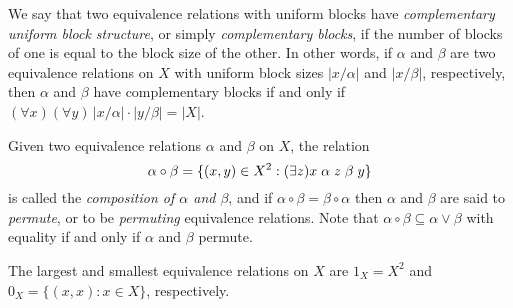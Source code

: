 \documentclass{amsart}
\theoremstyle{plain}
\theoremstyle{definition}
\theoremstyle{definition}
\numberwithin{equation}{section}
\newcommand{\<}{\ensuremath{\langle}}
\renewcommand{\>}{\ensuremath{\rangle}}
\newcommand{\Eq}{\ensuremath{\operatorname{Eq}}}
\newcommand{\rel}{\ensuremath{\mathrel}}
\newcommand{\join}{\ensuremath{\vee}}
\begin{document}
We say that two equivalence relations with uniform
blocks  have 
\emph{complementary uniform block structure}, or simply \emph{complementary
  blocks}, if the number of blocks of one is equal to
the block size of the other. In other words, if $\alpha$ and $\beta$ are two
equivalence relations on $X$ with uniform block sizes $|x/\alpha|$ and
$|x/\beta|$, respectively, then $\alpha$ and $\beta$ have complementary blocks
if and only if $(\forall x)(\forall y)\, |x/\alpha|\cdot |y/\beta| = |X|$.


Given two equivalence relations $\alpha$ and $\beta$ on $X$, the relation
\[
\alpha \circ \beta = \{(x,y) \in X^2: (\exists z)x\rel{\alpha} z
\rel{\beta} y\}
\]
is called the \emph{composition of $\alpha$ and $\beta$}, and if 
$\alpha \circ \beta = \beta \circ \alpha$ then $\alpha$ and $\beta$ are said to
\emph{permute}, or to be \emph{permuting} equivalence relations.  
Note that $\alpha \circ \beta \subseteq \alpha \join \beta$ with equality if and
only if $\alpha$ and $\beta$ permute.

The largest and smallest equivalence relations on $X$ are $1_X = X^2$
and $0_X = \{(x,x) : x \in X\}$, respectively.
\end{document}
